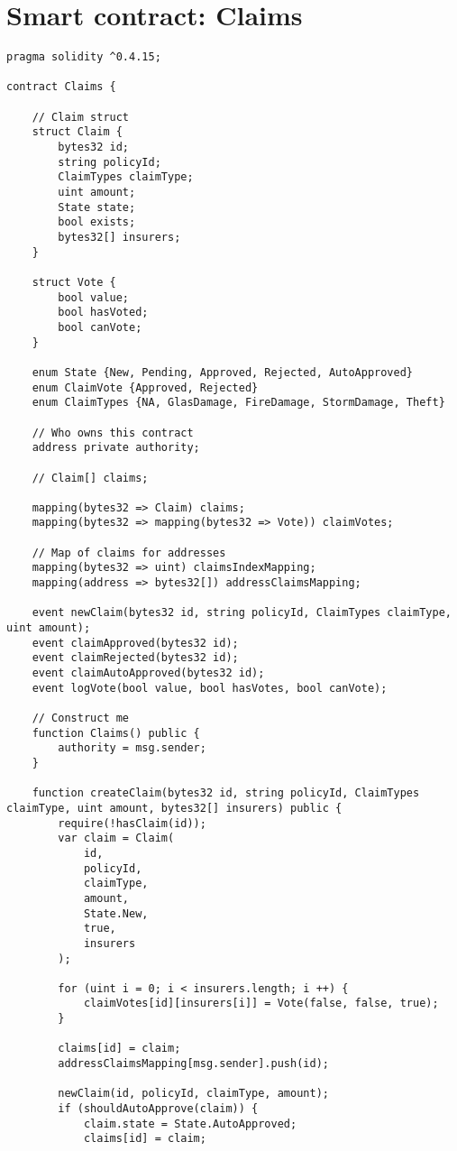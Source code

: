 \documentclass[firstyr,a4paper,oneside]{cam-thesis}%
\begin{document}
\chapter{Smart contract: Claims}\label{appendix:contract}
\begin{lstlisting}[language=Solidity]
pragma solidity ^0.4.15;

contract Claims {

    // Claim struct
    struct Claim {
        bytes32 id;
        string policyId;
        ClaimTypes claimType;
        uint amount;
        State state;
        bool exists;
        bytes32[] insurers;
    }

    struct Vote {
        bool value;
        bool hasVoted;
        bool canVote;
    }

    enum State {New, Pending, Approved, Rejected, AutoApproved}
    enum ClaimVote {Approved, Rejected}
    enum ClaimTypes {NA, GlasDamage, FireDamage, StormDamage, Theft}

    // Who owns this contract
    address private authority;

    // Claim[] claims;

    mapping(bytes32 => Claim) claims;
    mapping(bytes32 => mapping(bytes32 => Vote)) claimVotes;

    // Map of claims for addresses
    mapping(bytes32 => uint) claimsIndexMapping;
    mapping(address => bytes32[]) addressClaimsMapping;

    event newClaim(bytes32 id, string policyId, ClaimTypes claimType, uint amount);
    event claimApproved(bytes32 id);
    event claimRejected(bytes32 id);
    event claimAutoApproved(bytes32 id);
    event logVote(bool value, bool hasVotes, bool canVote);

    // Construct me
    function Claims() public {
        authority = msg.sender;
    }

    function createClaim(bytes32 id, string policyId, ClaimTypes claimType, uint amount, bytes32[] insurers) public {
        require(!hasClaim(id));
        var claim = Claim(
            id,
            policyId,
            claimType,
            amount,
            State.New,
            true,
            insurers
        );

        for (uint i = 0; i < insurers.length; i ++) {
            claimVotes[id][insurers[i]] = Vote(false, false, true);
        }

        claims[id] = claim;
        addressClaimsMapping[msg.sender].push(id);

        newClaim(id, policyId, claimType, amount);
        if (shouldAutoApprove(claim)) {
            claim.state = State.AutoApproved;
            claims[id] = claim;


\end{lstlisting}
\end{document}
